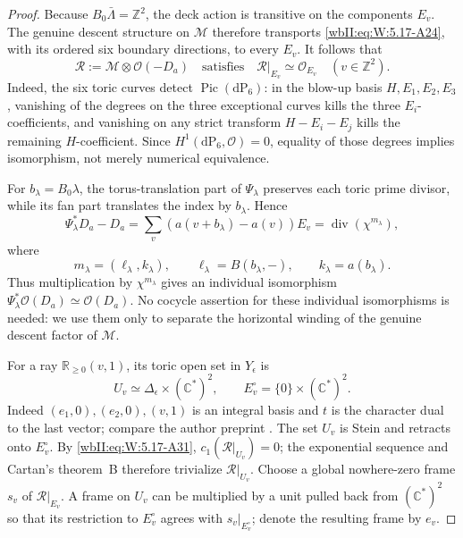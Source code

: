 \begin{proof}
Because \(B_0\bar\Lambda=\mathbb Z^2\), the deck action is transitive on
the components \(E_v\).  The genuine descent structure on \(\mathcal M\)
therefore transports \eqref{wbII:eq:W:5.17-A24}, with its ordered six boundary directions,
to every \(E_v\).  It follows that
\[
 \mathcal R:=\mathcal M\otimes\mathcal O(-D_a)
 \quad\text{satisfies}\quad
 \mathcal R|_{E_v}\simeq\mathcal O_{E_v}
 \quad(v\in\mathbb Z^2).
\tag{W.131}\label{wbII:eq:W:5.17-A31}
\]
Indeed, the six toric curves detect \(\operatorname{Pic}(\mathrm{dP}_6)\):
in the blow-up basis \(H,E_1,E_2,E_3\), vanishing of the degrees on the
three exceptional curves kills the three \(E_i\)-coefficients, and
vanishing on any strict transform \(H-E_i-E_j\) kills the remaining
\(H\)-coefficient.  Since
\(H^1(\mathrm{dP}_6,\mathcal O)=0\), equality of those degrees implies
isomorphism, not merely numerical equivalence.

For \(b_\lambda=B_0\lambda\), the torus-translation part of
\(\Psi_\lambda\) preserves each toric prime divisor, while its fan part
translates the index by \(b_\lambda\).  Hence
\[
 \Psi_\lambda^*D_a-D_a
 =\sum_v(a(v+b_\lambda)-a(v))E_v
 =\operatorname{div}(\chi^{m_\lambda}),
\tag{W.132}\label{wbII:eq:W:5.17-A32}
\]
where
\[
 m_\lambda=(\ell_\lambda,k_\lambda),
 \qquad
 \ell_\lambda=B(b_\lambda,-),
 \qquad
 k_\lambda=a(b_\lambda).
\tag{W.133}\label{wbII:eq:W:5.17-A33}
\]
Thus multiplication by \(\chi^{m_\lambda}\) gives an individual
isomorphism
\(\Psi_\lambda^*\mathcal O(D_a)\simeq\mathcal O(D_a)\).
No cocycle assertion for these individual isomorphisms is needed: we use
them only to separate the horizontal winding of the genuine descent factor
of \(\mathcal M\).

For a ray \(\mathbb R_{\ge0}(v,1)\), its toric open set in
\(Y_\epsilon\) is
\[
 U_v\simeq\Delta_\epsilon\times(\mathbb C^*)^2,
 \qquad E_v^\circ=\{0\}\times(\mathbb C^*)^2.
\tag{W.134}\label{wbII:eq:W:5.17-A34}
\]
Indeed \((e_1,0),(e_2,0),(v,1)\) is an integral basis and \(t\) is the
character dual to the last vector; compare the author preprint
\cite[Example~1.2.21, p.~31]{CoxLittleSchenck2011}.
The set \(U_v\) is Stein and retracts
onto \(E_v^\circ\).  By \eqref{wbII:eq:W:5.17-A31},
\(c_1(\mathcal R|_{U_v})=0\); the exponential sequence and Cartan's
theorem~B therefore trivialize \(\mathcal R|_{U_v}\).  Choose a global
nowhere-zero frame \(s_v\) of \(\mathcal R|_{E_v}\).  A frame on \(U_v\) can be
multiplied by a unit pulled back from \((\mathbb C^*)^2\) so that its
restriction to \(E_v^\circ\) agrees with \(s_v|_{E_v^\circ}\); denote the
resulting frame by \(e_v\).


\end{proof}
